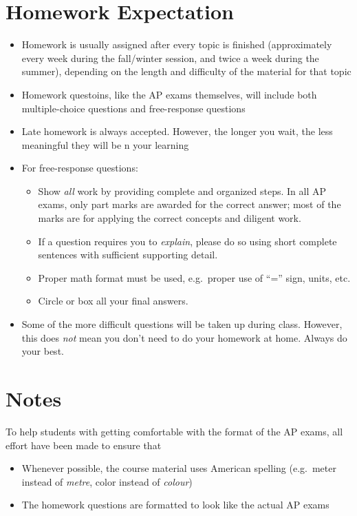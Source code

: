 \documentclass{../../oss-handout}
\begin{document}
\section*{Homework Expectation}
\begin{itemize}[noitemsep,topsep=0pt,leftmargin=18pt]
\item Homework is usually assigned after every topic is finished (approximately
  every week during the fall/winter session, and twice a week during the
  summer), depending on the length and difficulty of the material for that
  topic
\item Homework questoins, like the AP exams themselves, will include both
  multiple-choice questions and free-response questions
\item Late homework is always accepted. However, the longer you wait, the less
  meaningful they will be n your learning
\item For free-response questions:
  \begin{itemize}[noitemsep,topsep=0pt,leftmargin=15pt]
  \item Show \emph{all} work by providing complete and organized steps. In all
    AP exams, only part marks are awarded for the correct answer; most of the
    marks are for applying the correct concepts and diligent work.
  \item If a question requires you to \emph{explain}, please do so using
    short complete sentences with sufficient supporting detail.
  \item Proper math format must be used, e.g.\ proper use of ``='' sign, units,
    etc.
  \item Circle or box all your final answers.
  \end{itemize}
\item Some of the more difficult questions will be taken up during class.
  However, this does \emph{not} mean you don't need to do your homework at
  home. Always do your best.
\end{itemize}


\section*{Notes}
To help students with getting comfortable with the format of the AP exams, all
effort have been made to ensure that
\begin{itemize}[noitemsep,topsep=0pt,leftmargin=15pt]
\item Whenever possible, the course material uses American spelling (e.g.\
  meter instead of \emph{metre}, color instead of \emph{colour})
\item The homework questions are formatted to look like the actual AP exams
\end{itemize}
\end{document}
